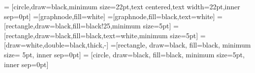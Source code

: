 \usepackage{microtype,marvosym}


\usepackage{tikz,pgfplots}
\pgfplotsset{compat=newest}
\pgfplotsset{plot coordinates/math parser=false}

\usetikzlibrary{arrows,shapes,plotmarks,pgfplots.colormaps}
\tikzset{>=stealth'} 
 = 
   [circle,draw=black,minimum size=22pt,text centered,text
     width=22pt,inner sep=0pt] 
   =[graphnode,fill=white]
   =[graphnode,fill=black,text=white]
   =[rectangle,draw=black,fill=black!25,minimum size=5pt]
 =[rectangle,draw=black,fill=black,text=white,minimum size=5pt]
  =[draw=white,double=black,thick,-]
 =[rectangle, draw=black, fill=black, minimum size=
5pt, inner sep=0pt]
 = [circle, draw=black, fill=black, minimum
size=5pt, inner sep=0pt]

\pgfplotsset{compat=newest}

\newcommand{\g}{\,|\,} 
\newcommand{\de}{\partial}
\renewcommand{\d}{\:d} 
\newcommand{\eps}{\epsilon}
\newcommand{\dd}{\mathrm{d}}
\newcommand{\ddd}{\mathsf{d}}
\newcommand{\DD}{\mathsf{D}}
\newcommand{\Exp}{\mathbb{E}}
\newcommand{\Ent}{\mathbb{H}}
\newcommand{\Cov}{\operatorname{cov}} 
\newcommand{\cov}{\operatorname{cov}} 
\newcommand{\erf}{\operatorname{erf}} 
\renewcommand{\H}{\mathcal{H}}
\newcommand{\K}{\mathcal{K}} 
\newcommand{\KL}{\text{KL}} 
\renewcommand{\Re}{\mathbb{R}}
\newcommand{\Co}{\mathbb{C}}
\newcommand{\one}{\mathbf{1}}
\newcommand{\const}{\text{const.}}
\newcommand{\diag}{\operatorname{diag}}
\newcommand{\Dcal}{\mathcal{D}} 
\newcommand{\N}{\mathcal{N}} 
\newcommand{\W}{\mathcal{W}} 
\newcommand{\cS}{\mathcal{S}} 
\newcommand{\sT}{\mathsf{T}} 
\newcommand{\B}{\mathcal{B}} 
\newcommand{\C}{\mathcal{C}}
\renewcommand{\L}{\mathcal{L}}
\newcommand{\Trans}{^{\intercal}} 
\newcommand{\argmin}{\operatorname*{arg\:min}}
\newcommand{\argmax}{\operatorname*{arg\:max}}
\renewcommand{\det}{\operatorname{det}}
\newcommand{\var}{\operatorname{var}}
\renewcommand{\=}{\operatorname*{=}}
\newcommand{\myexp}[1]{\exp{\left[ #1 \right] }}
\newcommand{\expmap}{\mathrm{Exp}}
\newcommand{\logmap}{\mathrm{Log}}

